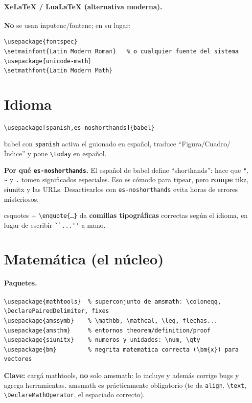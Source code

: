 \documentclass[11pt,a4paper]{article}
\newcommand{\C}[1]{\texttt{\textbackslash #1}}
\newcommand{\pkg}[1]{\textsf{#1}}
\begin{document}
\paragraph{XeLaTeX / LuaLaTeX (alternativa moderna).} \textbf{No} se usan
\pkg{inputenc}/\pkg{fontenc}; en su lugar:
\begin{lstlisting}
\usepackage{fontspec}
\setmainfont{Latin Modern Roman}   % o cualquier fuente del sistema
\usepackage{unicode-math}
\setmathfont{Latin Modern Math}
\end{lstlisting}

\section{Idioma}
\begin{lstlisting}
\usepackage[spanish,es-noshorthands]{babel}
\end{lstlisting}
\pkg{babel} con \texttt{spanish} activa el guionado en español, traduce
\enquote{Figura/Cuadro/Índice} y pone \C{today} en español.

\noindent\textbf{Por qué \texttt{es-noshorthands}.} El español de \pkg{babel}
define \enquote{shorthands}: hace que \verb|"|, \verb|~| y \verb|.| tomen
significados especiales. Eso es cómodo para tipear, pero \textbf{rompe}
\pkg{tikz}, \pkg{siunitx} y las URLs. Desactivarlos con \texttt{es-noshorthands}
evita horas de errores misteriosos.

\noindent\pkg{csquotes} + \C{enquote\{\dots\}} da \textbf{comillas tipográficas}
correctas según el idioma, en lugar de escribir \verb|``...''| a mano.

\section{Matemática (el núcleo)}
\paragraph{Paquetes.}
\begin{lstlisting}
\usepackage{mathtools}  % superconjunto de amsmath: \coloneqq, \DeclarePairedDelimiter, fixes
\usepackage{amssymb}    % \mathbb, \mathcal, \leq, flechas...
\usepackage{amsthm}     % entornos theorem/definition/proof
\usepackage{siunitx}    % numeros y unidades: \num, \qty
\usepackage{bm}         % negrita matematica correcta (\bm{x}) para vectores
\end{lstlisting}
\textbf{Clave:} cargá \pkg{mathtools}, \textbf{no} solo \pkg{amsmath}: lo incluye
y además corrige bugs y agrega herramientas. \pkg{amsmath} es prácticamente
obligatorio (te da \texttt{align}, \C{text}, \C{DeclareMathOperator}, el espaciado
correcto).
\end{document}
